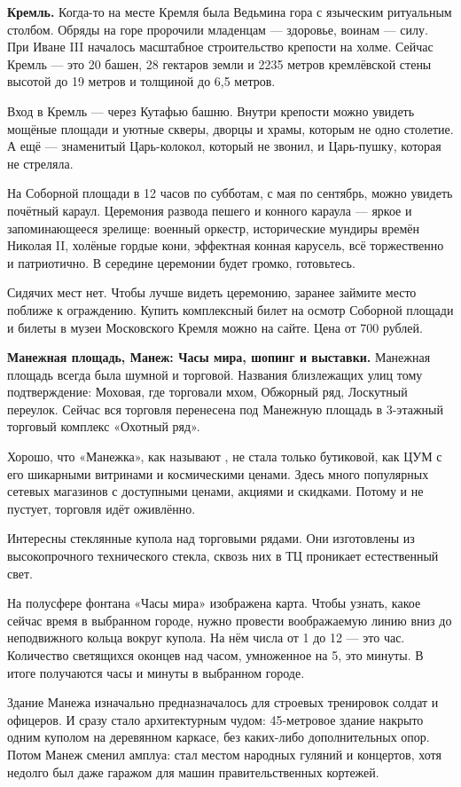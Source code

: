 \textbf{Кремль.} Когда-то на месте Кремля была Ведьмина гора с языческим ритуальным столбом. Обряды на горе пророчили младенцам — здоровье, воинам — силу. При Иване III началось масштабное строительство крепости на холме. Сейчас Кремль --- это 20 башен, 28 гектаров земли и 2235 метров кремлёвской стены высотой до 19 метров и толщиной до 6,5 метров.

Вход в Кремль --- через Кутафью башню. Внутри крепости можно увидеть мощёные площади и уютные скверы, дворцы и храмы, которым не одно столетие. А ещё --- знаменитый Царь-колокол, который не звонил, и Царь-пушку, которая не стреляла.

На Соборной площади в 12 часов по субботам, с мая по сентябрь, можно увидеть почётный караул. Церемония развода пешего и конного караула --- яркое и запоминающееся зрелище: военный оркестр, исторические мундиры времён Николая II, холёные гордые кони, эффектная конная карусель, всё торжественно и патриотично. В середине церемонии будет громко, готовьтесь.

Сидячих мест нет. Чтобы лучше видеть церемонию, заранее займите место поближе к ограждению. Купить комплексный билет на осмотр Соборной площади и билеты в музеи Московского Кремля можно на сайте. Цена от 700 рублей.


\textbf{Манежная площадь, Манеж: Часы мира, шопинг и выставки.} Манежная площадь всегда была шумной и торговой. Названия близлежащих улиц тому подтверждение: Моховая, где торговали мхом, Обжорный ряд, Лоскутный переулок. Сейчас вся торговля перенесена под Манежную площадь в 3-этажный торговый комплекс «Охотный ряд».

Хорошо, что «Манежка», как называют , не стала только бутиковой, как ЦУМ с его шикарными витринами и космическими ценами. Здесь много популярных сетевых магазинов с доступными ценами, акциями и скидками. Потому и не пустует, торговля идёт оживлённо.

Интересны стеклянные купола над торговыми рядами. Они изготовлены из высокопрочного технического стекла, сквозь них в ТЦ проникает естественный свет.

На полусфере фонтана «Часы мира» изображена карта. Чтобы узнать, какое сейчас время в выбранном городе, нужно провести воображаемую линию вниз до неподвижного кольца вокруг купола. На нём числа от 1 до 12 — это час. Количество светящихся оконцев над часом, умноженное на 5, это минуты. В итоге получаются часы и минуты в выбранном городе.

Здание Манежа изначально предназначалось для строевых тренировок солдат и офицеров. И сразу стало архитектурным чудом: 45-метровое здание накрыто одним куполом на деревянном каркасе, без каких-либо дополнительных опор. Потом Манеж сменил амплуа: стал местом народных гуляний и концертов, хотя недолго был даже гаражом для машин правительственных кортежей.

